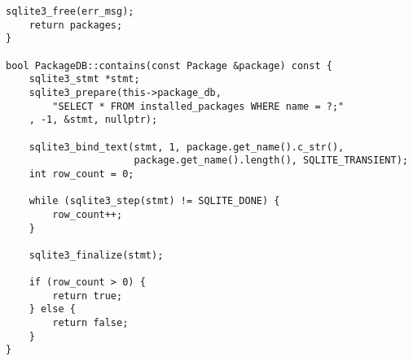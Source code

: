 \begin{lstlisting}[style=cpp,
				   caption=Хранилище за глобално инсталирани пакети,
				   label={lst:package-db}]
	sqlite3_free(err_msg);
	return packages;
}

bool PackageDB::contains(const Package &package) const {
	sqlite3_stmt *stmt;
	sqlite3_prepare(this->package_db,
		"SELECT * FROM installed_packages WHERE name = ?;"
	, -1, &stmt, nullptr);
	
	sqlite3_bind_text(stmt, 1, package.get_name().c_str(),
					  package.get_name().length(), SQLITE_TRANSIENT);
	int row_count = 0;
	
	while (sqlite3_step(stmt) != SQLITE_DONE) {
		row_count++;
	}
	
	sqlite3_finalize(stmt);
	
	if (row_count > 0) {
		return true;
	} else {
		return false;
	}
}
\end{lstlisting}
